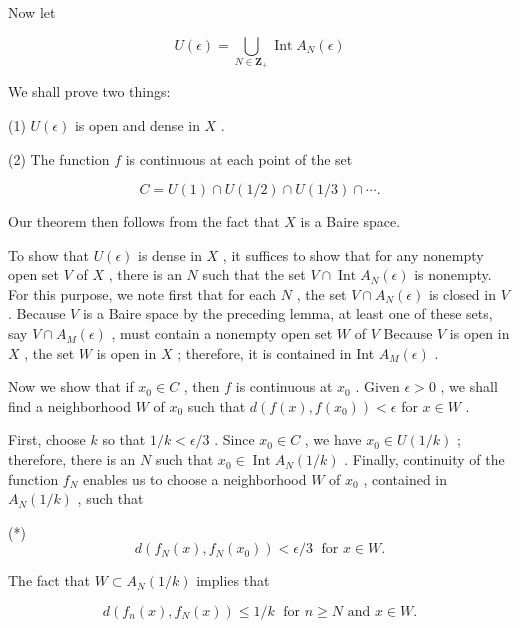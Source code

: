 Now let

\[
U\left( \epsilon \right)  = \mathop{\bigcup }\limits_{{N \in  {\mathbf{Z}}_{ + }}}\operatorname{Int}{A}_{N}\left( \epsilon \right)
\]

We shall prove two things:

(1) \(U\left( \epsilon \right)\) is open and dense in \(X\) .

(2) The function \(f\) is continuous at each point of the set

\[
C = U\left( 1\right)  \cap  U\left( {1/2}\right)  \cap  U\left( {1/3}\right)  \cap  \cdots .
\]

Our theorem then follows from the fact that \(X\) is a Baire space.

To show that \(U\left( \epsilon \right)\) is dense in \(X\) , it suffices to show that for any nonempty open set \(V\) of \(X\) , there is an \(N\) such that the set \(V \cap  \operatorname{Int}{A}_{N}\left( \epsilon \right)\) is nonempty. For this purpose, we note first that for each \(N\) , the set \(V \cap  {A}_{N}\left( \epsilon \right)\) is closed in \(V\) . Because \(V\) is a Baire space by the preceding lemma, at least one of these sets, say \(V \cap  {A}_{M}\left( \epsilon \right)\) , must contain a nonempty open set \(W\) of \(V\) Because \(V\) is open in \(X\) , the set \(W\) is open in \(X\) ; therefore, it is contained in Int \({A}_{M}\left( \epsilon \right)\) .

Now we show that if \({x}_{0} \in  C\) , then \(f\) is continuous at \({x}_{0}\) . Given \(\epsilon  > 0\) , we shall find a neighborhood \(W\) of \({x}_{0}\) such that \(d\left( {f\left( x\right) ,f\left( {x}_{0}\right) }\right)  < \epsilon\) for \(x \in  W\) .

First, choose \(k\) so that \(1/k < \epsilon /3\) . Since \({x}_{0} \in  C\) , we have \({x}_{0} \in  U\left( {1/k}\right)\) ; therefore, there is an \(N\) such that \({x}_{0} \in  \operatorname{Int}{A}_{N}\left( {1/k}\right)\) . Finally, continuity of the function \({f}_{N}\) enables us to choose a neighborhood \(W\) of \({x}_{0}\) , contained in \({A}_{N}\left( {1/k}\right)\) , such that

(*)
\[
d\left( {{f}_{N}\left( x\right) ,{f}_{N}\left( {x}_{0}\right) }\right)  < \epsilon /3\;\text{ for }x \in  W.
\]

The fact that \(W \subset  {A}_{N}\left( {1/k}\right)\) implies that

\[
d\left( {{f}_{n}\left( x\right) ,{f}_{N}\left( x\right) }\right)  \leq  1/k\;\text{ for }n \geq  N\text{ and }x \in  W.
\]

